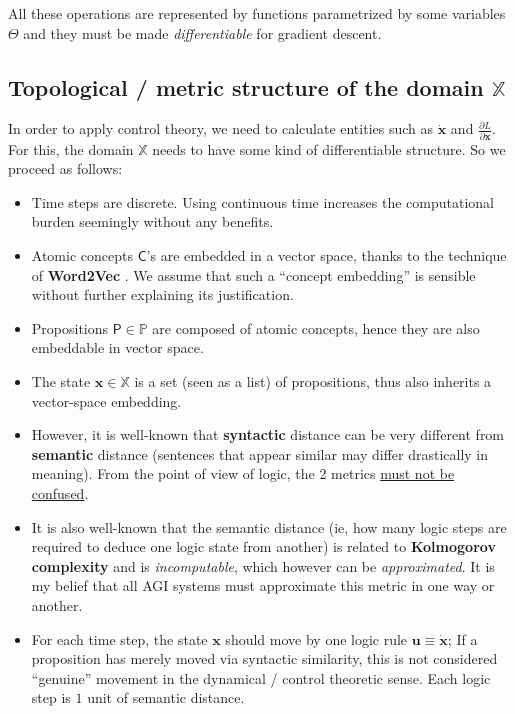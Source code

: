 \documentclass[orivec]{llncs}
\newcommand{\vect}[1]{\boldsymbol{#1}}
\begin{document}
All these operations are represented by functions parametrized by some variables $\Theta$ and they must be made \textit{differentiable} for gradient descent.

\subsection{Topological / metric structure of the domain $\mathbb{X}$}

In order to apply control theory, we need to calculate entities such as $\dot{\vect{x}}$ and $\displaystyle \frac{\partial L}{\partial \dot{\vect{x}}}$.  For this, the domain $\mathbb{X}$ needs to have some kind of differentiable structure.  So we proceed as follows:
\begin{itemize}
	\item Time steps are discrete.  Using continuous time increases the computational burden seemingly without any benefits.
	\item Atomic concepts $\mathsf{C}$'s are embedded in a vector space, thanks to the technique of \textbf{Word2Vec} \cite{Word2Vec}.  We assume that such a ``concept embedding'' is sensible without further explaining its justification.
	\item Propositions $\mathsf{P} \in \mathbb{P}$ are composed of atomic concepts, hence they are also embeddable in vector space.
	\item The state $\vect{x} \in \mathbb{X}$ is a set (seen as a list) of propositions, thus also inherits a vector-space embedding.
	\item However, it is well-known that \textbf{syntactic} distance can be very different from \textbf{semantic} distance (sentences that appear similar may differ drastically in meaning).  From the point of view of logic, the 2 metrics \uline{must not be confused}.
	\item It is also well-known that the semantic distance (ie, how many logic steps are required to deduce one logic state from another) is related to \textbf{Kolmogorov complexity} \cite{Li2008} and is \textit{incomputable}, which however can be \textit{approximated}.  It is my belief that all AGI systems must approximate this metric in one way or another.
	\item For each time step, the state $\vect{x}$ should move by one logic rule $\vect{u} \equiv \dot{\vect{x}}$; If a proposition has merely moved via syntactic similarity, this is not considered ``genuine'' movement in the dynamical / control theoretic sense.  Each logic step is $1$ unit of semantic distance.

\end{itemize}
\end{document}
